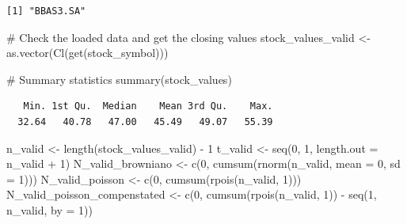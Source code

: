 \documentclass[
  letterpaper,
  DIV=11,
  numbers=noendperiod]{scrreprt}
\newenvironment{Shaded}{\begin{snugshade}}{\end{snugshade}}
\newcommand{\AttributeTok}[1]{\textcolor[rgb]{0.40,0.45,0.13}{#1}}
\newcommand{\CommentTok}[1]{\textcolor[rgb]{0.37,0.37,0.37}{#1}}
\newcommand{\DecValTok}[1]{\textcolor[rgb]{0.68,0.00,0.00}{#1}}
\newcommand{\FunctionTok}[1]{\textcolor[rgb]{0.28,0.35,0.67}{#1}}
\newcommand{\NormalTok}[1]{\textcolor[rgb]{0.00,0.23,0.31}{#1}}
\newcommand{\OtherTok}[1]{\textcolor[rgb]{0.00,0.23,0.31}{#1}}
\newcommand{\SpecialCharTok}[1]{\textcolor[rgb]{0.37,0.37,0.37}{#1}}
\begin{document}
\begin{verbatim}
[1] "BBAS3.SA"
\end{verbatim}

\begin{Shaded}
\begin{Highlighting}[]
\CommentTok{\# Check the loaded data and get the closing values}
\NormalTok{stock\_values\_valid }\OtherTok{\textless{}{-}} \FunctionTok{as.vector}\NormalTok{(}\FunctionTok{Cl}\NormalTok{(}\FunctionTok{get}\NormalTok{(stock\_symbol)))}

\CommentTok{\# Summary statistics}
\FunctionTok{summary}\NormalTok{(stock\_values)}
\end{Highlighting}
\end{Shaded}

\begin{verbatim}
   Min. 1st Qu.  Median    Mean 3rd Qu.    Max. 
  32.64   40.78   47.00   45.49   49.07   55.39 
\end{verbatim}

\begin{Shaded}
\begin{Highlighting}[]
\NormalTok{n\_valid }\OtherTok{\textless{}{-}} \FunctionTok{length}\NormalTok{(stock\_values\_valid) }\SpecialCharTok{{-}} \DecValTok{1}
\NormalTok{t\_valid }\OtherTok{\textless{}{-}} \FunctionTok{seq}\NormalTok{(}\DecValTok{0}\NormalTok{, }\DecValTok{1}\NormalTok{, }\AttributeTok{length.out =}\NormalTok{ n\_valid }\SpecialCharTok{+} \DecValTok{1}\NormalTok{)}
\NormalTok{N\_valid\_browniano }\OtherTok{\textless{}{-}} \FunctionTok{c}\NormalTok{(}\DecValTok{0}\NormalTok{, }\FunctionTok{cumsum}\NormalTok{(}\FunctionTok{rnorm}\NormalTok{(n\_valid, }\AttributeTok{mean =} \DecValTok{0}\NormalTok{, }\AttributeTok{sd =} \DecValTok{1}\NormalTok{)))}
\NormalTok{N\_valid\_poisson }\OtherTok{\textless{}{-}} \FunctionTok{c}\NormalTok{(}\DecValTok{0}\NormalTok{, }\FunctionTok{cumsum}\NormalTok{(}\FunctionTok{rpois}\NormalTok{(n\_valid, }\DecValTok{1}\NormalTok{)))}
\NormalTok{N\_valid\_poisson\_compenstated }\OtherTok{\textless{}{-}} \FunctionTok{c}\NormalTok{(}\DecValTok{0}\NormalTok{, }\FunctionTok{cumsum}\NormalTok{(}\FunctionTok{rpois}\NormalTok{(n\_valid, }\DecValTok{1}\NormalTok{)) }\SpecialCharTok{{-}} 
                                  \FunctionTok{seq}\NormalTok{(}\DecValTok{1}\NormalTok{, n\_valid, }\AttributeTok{by =} \DecValTok{1}\NormalTok{))}
\end{Highlighting}
\end{Shaded}
\end{document}
